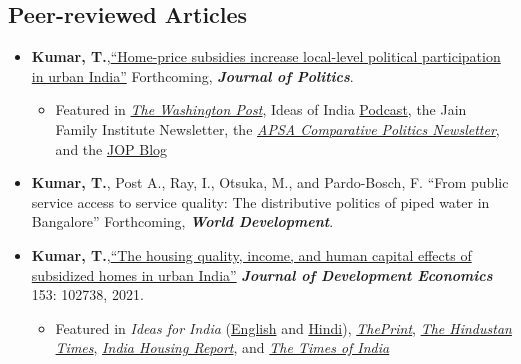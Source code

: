 \documentclass[11pt]{article}
\begin{document}
\subsection*{Peer-reviewed Articles}
\begin{itemize}
	



			\item[] \textbf{Kumar, T.},\href{https://doi.org/10.1086/715605}{``Home-price subsidies increase local-level political participation in urban India''} Forthcoming, \textit{\textbf{Journal of Politics}}.
			\begin{itemize}[nosep]
			\item Featured in \href{https://www.washingtonpost.com/news/monkey-cage/wp/2019/01/31/heres-what-gavin-newsom-elizabeth-warren-and-microsoft-should-know-if-want-to-end-the-affordable-housing-crisis/?tid=sm_tw_cage}{\textit{The Washington Post}},  Ideas of India \href{https://www.discoursemagazine.com/politics/2020/12/24/ideas-of-india-how-does-subsidizing-housing-prices-shape-political-behavior}{Podcast},  the Jain Family Institute Newsletter, the \href{https://www.comparativepoliticsnewsletter.org/wp-content/uploads/2020/05/Spring-Newsletter-2020.pdf}{\textit{APSA Comparative Politics Newsletter}}, and the \href{https://jop.blogs.uni-hamburg.de/home-price-subsidies-increase-local-level-political-participation-in-urban-india/}{JOP Blog}  			\end{itemize}
			\item[] \textbf{Kumar, T.}, Post A., Ray, I., Otsuka, M., and Pardo-Bosch, F. ``From public service access to service quality: The distributive politics of piped water in Bangalore'' Forthcoming, \textbf{\textit{World Development}}.
	
			\item[]\textbf{Kumar, T.},\href{https://doi.org/10.1016/j.jdeveco.2021.102738}{``The housing quality, income, and human capital effects of subsidized homes in urban India''} \textit{\textbf{Journal of Development Economics}} 153: 102738, 2021.
\begin{itemize}
	\item Featured in \textit{Ideas for India} (\href{https://www.ideasforindia.in/topics/poverty-inequality/household-level-effects-of-affordable-housing-evidence-from-mumbai.html}{English} and \href{https://www.ideasforindia.in/topics/poverty-inequality/household-level-effects-of-affordable-housing-evidence-from-mumbai-hindi.html}{Hindi}), \href{https://theprint.in/opinion/mumbai-residents-win-govt-housing-lottery-and-spend-more-on-kids-education-jobs-study/290485/}{\textit{ThePrint}}, \href{https://www.hindustantimes.com/opinion/housing-is-a-welfare-weapon-it-can-help-people-escape-poverty-101629993983576.html}{\textit{The Hindustan Times}}, \href{https://indiahousingreport.in/outputs/opinion/housing-is-a-welfare-weapon-it-can-help-people-escape-poverty/}{\textit{India Housing Report}}, and \href{https://timesofindia.indiatimes.com/city/mumbai/mhada-home-winners-see-upswing-in-family-edu-pay-in-mumbai-study/articleshow/86468320.cms}{\textit{The Times of India}}


\end{itemize}
\end{itemize}
\end{document}
